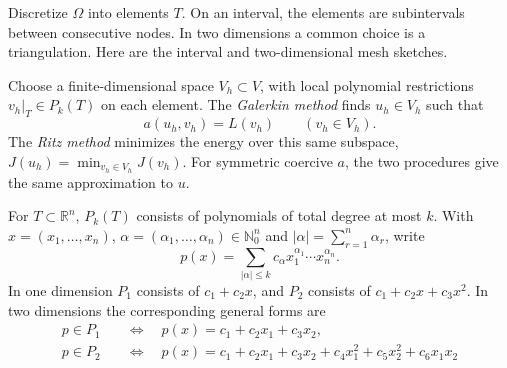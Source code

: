 \documentclass[11pt,a4paper]{article}
\begin{document}
Discretize \(\Omega\) into elements \(T\). On an interval, the elements are
subintervals between consecutive nodes. In two dimensions a common choice
is a triangulation. Here are the interval and two-dimensional mesh sketches.
\begin{center}
\end{center}

Choose a finite-dimensional space \(V_h\subset V\), with local
polynomial restrictions \(v_h|_T\in P_k(T)\) on each element.
The \emph{Galerkin method} finds \(u_h\in V_h\) such that
\[
 a(u_h,v_h)=L(v_h)\qquad(v_h\in V_h).
\]
The \emph{Ritz method} minimizes the energy over this same subspace,
\(J(u_h)=\min_{v_h\in V_h}J(v_h)\). For symmetric coercive \(a\),
the two procedures give the same approximation to \(u\).

For \(T\subset\mathbb R^n\), \(P_k(T)\) consists of polynomials of total
degree at most \(k\). With \(x=(x_1,\ldots,x_n)\),
\(\alpha=(\alpha_1,\ldots,\alpha_n)\in\mathbb N_0^n\)
and \(|\alpha|=\sum_{r=1}^n\alpha_r\), write
\[
 p(x)=\sum_{|\alpha|\le k}c_\alpha x_1^{\alpha_1}\cdots x_n^{\alpha_n}.
\]
In one dimension \(P_1\) consists of \(c_1+c_2x\), and \(P_2\) consists of
\(c_1+c_2x+c_3x^2\). In two dimensions the corresponding general forms are
\[
 \begin{aligned}
 p\in P_1&\quad\Longleftrightarrow\quad p(x)=c_1+c_2x_1+c_3x_2,\\
 p\in P_2&\quad\Longleftrightarrow\quad
 p(x)=c_1+c_2x_1+c_3x_2+c_4x_1^2+c_5x_2^2+c_6x_1x_2
 \end{aligned}
\]
\end{document}
